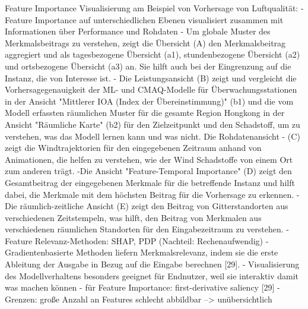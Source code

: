 \cite{palaniyappan2022aqx}Feature Importance Visualisierung am Beispiel von  Vorhersage von Luftqualität:
- Feature Importance auf unterschiedlichen Ebenen visualisiert zusammen mit Informationen über Performance und Rohdaten
- Um globale Muster des Merkmalsbeitrags zu verstehen, zeigt die Übersicht (A) den Merkmalsbeitrag aggregiert und als tagesbezogene Übersicht (a1), stundenbezogene Übersicht (a2) und ortsbezogene Übersicht (a3) an. Sie hilft auch bei der Eingrenzung auf die Instanz, die von Interesse ist. 
- Die Leistungsansicht (B) zeigt und vergleicht die Vorhersagegenauigkeit der ML- und CMAQ-Modelle für Überwachungsstationen in der Ansicht "Mittlerer IOA (Index der Übereinstimmung)" (b1) und die vom Modell erfassten räumlichen Muster für die gesamte Region Hongkong in der Ansicht "Räumliche Karte" (b2) für den Zielzeitpunkt und den Schadstoff, um zu verstehen, was das Modell lernen kann und was nicht. Die Rohdatenansicht 
- (C) zeigt die Windtrajektorien für den eingegebenen Zeitraum anhand von Animationen, die helfen zu verstehen, wie der Wind Schadstoffe von einem Ort zum anderen trägt. 
-Die Ansicht "Feature-Temporal Importance" (D) zeigt den Gesamtbeitrag der eingegebenen Merkmale für die betreffende Instanz und hilft dabei, die Merkmale mit dem höchsten Beitrag für die Vorhersage zu erkennen. 
- Die räumlich-zeitliche Ansicht (E) zeigt den Beitrag von Gitterstandorten aus verschiedenen Zeitstempeln, was hilft, den Beitrag von Merkmalen aus verschiedenen räumlichen Standorten für den Eingabezeitraum zu verstehen.
- Feature Relevanz-Methoden: SHAP, PDP (Nachteil: Rechenaufwendig)
-Gradientenbasierte Methoden liefern Merkmalsrelevanz, indem sie die erste Ableitung der Ausgabe in Bezug auf die Eingabe berechnen [29].
- Visualisierung des Modellverhaltens besonders geeignet für Endnutzer, weil sie interaktiv damit was machen können
- für Feature Importance: first-derivative saliency [29]
- Grenzen: große Anzahl an Features schlecht abbildbar --> unübersichtlich

